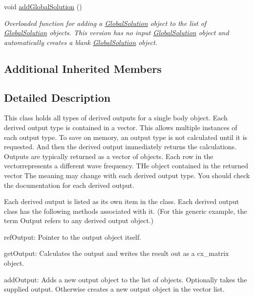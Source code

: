 \begin{DoxyCompactItemize}
\hypertarget{classosea_1_1ofreq_1_1_outputs_body_a13ae87153fcf43774b970aad94f0ca27}{void \hyperlink{classosea_1_1ofreq_1_1_outputs_body_a13ae87153fcf43774b970aad94f0ca27}{add\-Global\-Solution} ()}\label{classosea_1_1ofreq_1_1_outputs_body_a13ae87153fcf43774b970aad94f0ca27}

\begin{DoxyCompactList}\small\item\em Overloaded function for adding a \hyperlink{classosea_1_1ofreq_1_1_global_solution}{Global\-Solution} object to the list of \hyperlink{classosea_1_1ofreq_1_1_global_solution}{Global\-Solution} objects. This version has no input \hyperlink{classosea_1_1ofreq_1_1_global_solution}{Global\-Solution} object and automatically creates a blank \hyperlink{classosea_1_1ofreq_1_1_global_solution}{Global\-Solution} object. \end{DoxyCompactList}\end{DoxyCompactItemize}
\subsection*{Additional Inherited Members}


\subsection{Detailed Description}
This class holds all types of derived outputs for a single body object. Each derived output type is contained in a vector. This allows multiple instances of each output type. To save on memory, an output type is not calculated until it is requested. And then the derived output immediately returns the calculations. Outputs are typically returned as a vector of objects. Each row in the vectorrepresents a different wave frequency. T\-He object contained in the returned vector The meaning may change with each derived output type. You should check the documentation for each derived output.

Each derived output is listed as its own item in the class. Each derived output class has the following methods associated with it. (For this generic example, the term Output refers to any derived output object.)
\begin{DoxyEnumerate}
\item ref\-Output\-: Pointer to the output object itself.
\item get\-Output\-: Calculates the output and writes the result out as a cx\-\_\-matrix object.
\item add\-Output\-: Adds a new output object to the list of objects. Optionally takes the supplied output. Otherwise creates a new output object in the vector list.
\end{DoxyEnumerate}

